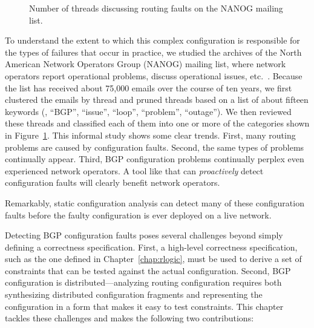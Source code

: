 \begin{figure}[t]
\begin{center}
\centering{}
\end{center}
\caption{Number of threads discussing routing
  faults on the NANOG mailing list.
}
\label{tab:nanogerrors}
\end{figure}


To understand the extent to which this complex configuration is
responsible for the types of failures that occur in practice, we studied
the archives of the North American Network Operators Group (NANOG)
mailing list, where network operators report operational problems,
discuss operational issues, etc.~\cite{nanog-list}.  Because the list
has received about 75,000 emails over the course of ten years, we first
clustered the emails by thread and pruned threads based on a list of
about fifteen keywords (\eg, ``BGP'', ``issue'', ``loop'', ``problem'',
``outage'').  We then reviewed these threads and classified each of them
into one or more of the categories shown in
Figure~\ref{tab:nanogerrors}.  This informal study shows some clear
trends.  First, many routing problems are caused by configuration
faults.  Second, the same types of problems continually appear.  Third,
BGP configuration problems continually perplex even experienced network
operators.  A tool like \rcc that can {\em proactively} detect
configuration faults will 
clearly benefit network operators.



Remarkably, static configuration analysis
can detect many of these configuration faults before the faulty
configuration is ever deployed on a live network.

Detecting BGP configuration faults poses several challenges beyond
simply defining a correctness specification.
%
First, a high-level correctness specification, such as the one defined
in Chapter~\ref{chap:rlogic}, must be used to derive a set of
constraints that can be tested against the actual configuration.
%
Second, BGP configuration is distributed---analyzing routing
configuration requires both synthesizing distributed configuration
fragments and representing the configuration in a form that makes it
easy to test constraints.
%
This chapter tackles these challenges and makes the following
two contributions:


